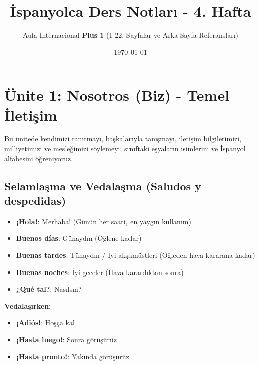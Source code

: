 \documentclass[12pt,a4paper]{article}
\title{\textbf{İspanyolca Ders Notları - 4. Hafta}}
\author{Aula Internacional \textbf{Plus 1} (1-22. Sayfalar ve Arka Sayfa Referansları)}
\date{\today}
\begin{document}
\maketitle
\tableofcontents
\newpage

\section{Ünite 1: Nosotros (Biz) - Temel İletişim}
Bu ünitede kendimizi tanıtmayı, başkalarıyla tanışmayı, iletişim bilgilerimizi, milliyetimizi ve mesleğimizi söylemeyi; sınıftaki eşyaların isimlerini ve İspanyol alfabesini öğreniyoruz.

\subsection{Selamlaşma ve Vedalaşma (Saludos y despedidas)}
\begin{itemize}
    \item \textbf{¡Hola!}: Merhaba! (Günün her saati, en yaygın kullanım)
    \item \textbf{Buenos días}: Günaydın (Öğlene kadar)
    \item \textbf{Buenas tardes}: Tünaydın / İyi akşamüstleri (Öğleden hava kararana kadar)
    \item \textbf{Buenas noches}: İyi geceler (Hava karardıktan sonra)
    \item \textbf{¿Qué tal?}: Nasılsın?
\end{itemize}

\textbf{Vedalaşırken:}
\begin{itemize}
    \item \textbf{¡Adiós!}: Hoşça kal
    \item \textbf{¡Hasta luego!}: Sonra görüşürüz
    \item \textbf{¡Hasta pronto!}: Yakında görüşürüz
\end{itemize}
\end{document}
